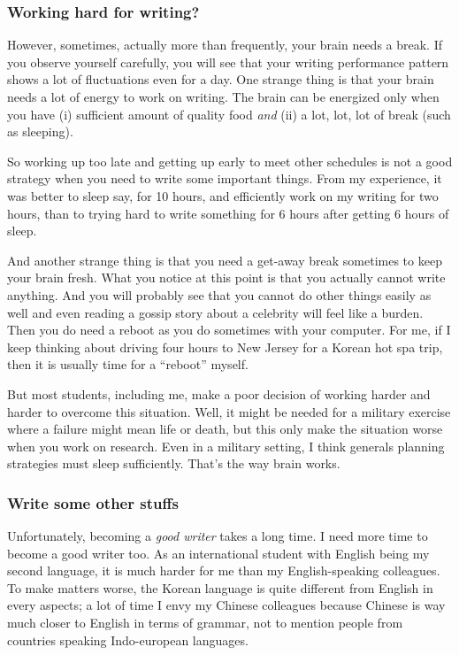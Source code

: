 \documentclass[11pt]{article}
\begin{document}
\subsubsection{Working hard for writing?}

However, sometimes, actually more than frequently, your brain needs a break.
If you observe yourself carefully, you will see that your writing performance
pattern shows a lot of fluctuations even for a day. One strange thing is that
your brain needs a lot of energy to work on writing. The brain can be
energized only when you have (i) sufficient amount of quality food \emph{and}
(ii) a lot, lot, lot of break (such as sleeping). 

So working up too late and getting up early to meet other schedules is not a
good strategy when you need to write some important things. From my
experience, it was better to sleep say, for 10 hours, and efficiently work on
my writing for two hours, than to trying hard to write something for 6 hours
after getting 6 hours of sleep. 

And another strange thing is that you need a get-away break sometimes to keep
your brain fresh. What you notice at this point is that you actually cannot
write anything. And you will probably see that you cannot do other things
easily as well and even reading a gossip story about a celebrity will feel like
a burden. Then you do need a reboot as you do sometimes with your computer.
For me, if I keep thinking about driving four hours to New Jersey for a Korean
hot spa trip, then it is usually time for a ``reboot'' myself. 

But most students, including me, make a poor decision of working harder and
harder to overcome this situation. Well, it might be needed for a military
exercise where a failure might mean life or death, but this only make the
situation worse when you work on research. Even in a military setting, I think
generals planning strategies must sleep sufficiently. That's the way brain
works. 


\subsubsection{Write some other stuffs}
Unfortunately, becoming a \emph{good writer} takes a long time. I need more
time to become a good writer too. As an international student with English
being my second language, it is much harder for me than my English-speaking
colleagues. To make matters worse, the Korean language is quite different from
English in every aspects; a lot of time I envy my Chinese colleagues because
Chinese is way much closer to English in terms of grammar, not to mention
people from countries speaking Indo-european languages.
\end{document}
